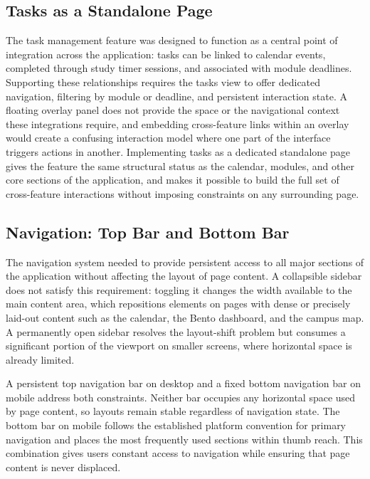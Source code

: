\subsection{Tasks as a Standalone Page}

The task management feature was designed to function as a central point of integration across the application: tasks can be linked to calendar events, completed through study timer sessions, and associated with module deadlines. Supporting these relationships requires the tasks view to offer dedicated navigation, filtering by module or deadline, and persistent interaction state. A floating overlay panel does not provide the space or the navigational context these integrations require, and embedding cross-feature links within an overlay would create a confusing interaction model where one part of the interface triggers actions in another. Implementing tasks as a dedicated standalone page gives the feature the same structural status as the calendar, modules, and other core sections of the application, and makes it possible to build the full set of cross-feature interactions without imposing constraints on any surrounding page.

\subsection{Navigation: Top Bar and Bottom Bar}

The navigation system needed to provide persistent access to all major sections of the application without affecting the layout of page content. A collapsible sidebar does not satisfy this requirement: toggling it changes the width available to the main content area, which repositions elements on pages with dense or precisely laid-out content such as the calendar, the Bento dashboard, and the campus map. A permanently open sidebar resolves the layout-shift problem but consumes a significant portion of the viewport on smaller screens, where horizontal space is already limited.

A persistent top navigation bar on desktop and a fixed bottom navigation bar on mobile address both constraints. Neither bar occupies any horizontal space used by page content, so layouts remain stable regardless of navigation state. The bottom bar on mobile follows the established platform convention for primary navigation and places the most frequently used sections within thumb reach. This combination gives users constant access to navigation while ensuring that page content is never displaced.


